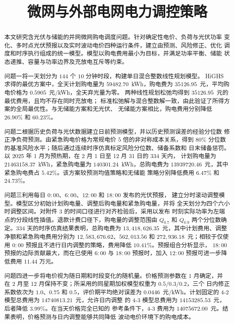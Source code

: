 \documentclass[withoutpreface,bwprint]{cumcmthesis}
\title{微网与外部电网电力调控策略}
\begin{document}
\maketitle

\begin{abstract}
本文研究含光伏与储能的并网微网购电调度问题。针对确定性电价、负荷与光伏功率
变化、多时点光伏预报以及实时波动电价四种运行条件，建立由预测、风险修正、优化
调度和时序执行组成的统一模型。模型以购电费用最小为目标，并满足功率平衡、储能
状态递推、容量与功率边界及充放电互斥等约束。

问题一将一天划分为 $144$ 个 $10$ 分钟时段，构建单日混合整数线性规划模型。
HiGHS 求得的最优方案中，全天计划购电量为 $59482.70$~kWh，购电费为
$35126.95$~元，平均购电价格为 $0.5905$~元/kWh，全天弃光量为零。
两种线性规划松弛均得到 $35126.95$~元的最优费用，且均不存在同时充放电；
标准松弛解与混合整数解一致，由此验证了所得方案的全局最优性。与无储能方案和无光伏、
无储能方案相比，购电费用分别降低 $26.90\%$ 和 $60.23\%$。

问题二根据历史负荷与光伏数据建立日前预测模型，并以历史预测误差的经验分位数
修正净负荷预测。由紧急购电价格为常规电价 $5$ 倍的非对称成本关系，得到
$80\%$ 分位数的基准风险水平；随后通过连续时序仿真标定风险分位数、储备系数和
日末储备惩罚。以 2025 年 1 月为预热期，在 2 月 1 日至 12 月 31 日的 $334$ 天内，
计划购电量为 $21463158.37$~kWh，紧急购电量为 $140301.24$~kWh，总购电费为
$13939720.46$~元，其中紧急购电费占 $5.42\%$。该方案较预测均值策略和无储能
策略分别降低费用 $6.47\%$ 和 $24.73\%$。

问题三利用每日 $0{:}00$、$6{:}00$、$12{:}00$ 和 $18{:}00$ 发布的光伏预报，
建立分时滚动调整模型。模型区分初始计划购电量、调整后购电量和紧急购电量，并将
全天划分为四个六小时调整区间。对附件 3 的时间口径进行对齐检验后，采用以发布
时刻实际功率为左端点的分段线性插值。退款计费口径下，购电量的调整范围由
$Q_{0.7}$ 和 $Q_{0.9}$ 两个分位数确定。$334$ 天的时序仿真结果表明，总购电费为
$13{,}418{,}626.35$~元，其中计划费用、调整净额和紧急购电费用分别为
$12{,}583{,}676.62$、$562{,}013.56$ 和 $272{,}936.18$~元；相较于仅使用
$0{:}00$ 预报且不进行日内调整的策略，费用降低 $10.41\%$。预报组合分析显示，
$18{:}00$ 预报的边际贡献最大，而在已使用 $6{:}00$ 与 $18{:}00$ 预报时，加入
$12{:}00$ 预报可进一步降低费用 $11.44$ 万元。

问题四进一步将电价视为随日期和时段变化的随机量。价格预测参数在 1 月确定，并
在 2 月至 12 月保持不变；所采用的同星期加权模型权重为 $0.5/0.3/0.2$，三个
日内修正系数依次为 $1.0$、$0.75$ 和 $0.5$，评价期平均绝对误差为
$0.0446$~元/kWh。计划固定的 4-2 模型总费用为 $14740813.21$~元，允许日内调整
的 4-3 模型总费用为 $14153285.53$~元，后者降低 $3.99\%$。在当天价格完全已知的
参考条件下，4-3 费用为 $14075672.00$~元。结果表明，价格预测与日内调整能够共同降低
波动电价环境下的购电成本。

\end{abstract}
\end{document}
